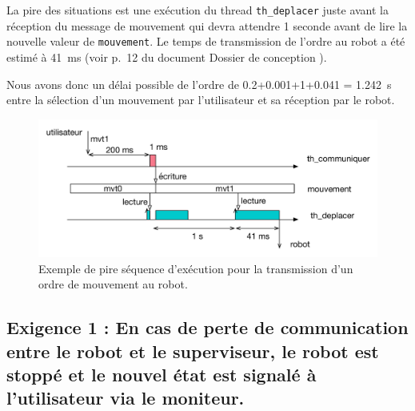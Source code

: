 \documentclass[11pt, a4paper]{paper}
\begin{document}
{La pire des situations est une exécution du thread {\tt th\_deplacer} juste avant la réception du message de mouvement qui devra attendre 1 seconde avant de lire la nouvelle valeur de {\tt mouvement}. Le temps de transmission de l'ordre au robot a été estimé à 41~ms (voir p.~12 du document \og Dossier de conception \fg).

Nous avons donc un délai possible de l'ordre de 0.2+0.001+1+0.041 = 1.242~s entre la sélection d'un mouvement par l'utilisateur et sa réception par le robot.

\begin{figure}[htbp]
\begin{center}
\includegraphics[scale=0.6]{./figures-pdf/sequence}
\caption{\color{red}Exemple de pire séquence d'exécution pour la transmission d'un ordre de mouvement au robot.}
\label{fig:seq}
\end{center}
\end{figure}
}

\subsection{Exigence 1 : En cas de perte de communication entre le robot et le superviseur, le robot est stoppé et le nouvel état est signalé à l'utilisateur via le moniteur.}
\end{document}
